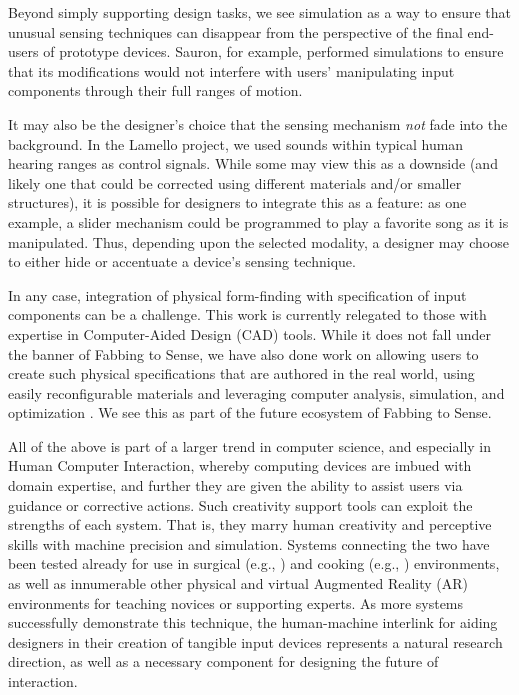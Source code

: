 Beyond simply supporting design tasks, we see simulation as a way to ensure that unusual sensing techniques can disappear from the perspective of the final end-users of prototype devices. Sauron, for example, performed simulations to ensure that its modifications would not interfere with users' manipulating input components through their full ranges of motion.

It may also be the designer's choice that the sensing mechanism \emph{not} fade into the background. In the Lamello project, we used sounds within typical human hearing ranges as control signals. While some may view this as a downside (and likely one that could be corrected using different materials and/or smaller structures), it is possible for designers to integrate this as a feature: as one example, a slider mechanism could be programmed to play a favorite song as it is manipulated. Thus, depending upon the selected modality, a designer may choose to either hide or accentuate a device's sensing technique.

In any case, integration of physical form-finding with specification of input components can be a challenge. This work is currently relegated to those with expertise in Computer-Aided Design (CAD) tools. While it does not fall under the banner of Fabbing to Sense, we have also done work on allowing users to create such physical specifications that are authored in the real world, using easily reconfigurable materials and leveraging computer analysis, simulation, and optimization \cite{savage-mmarks}. We see this as part of the future ecosystem of Fabbing to Sense.

All of the above is part of a larger trend in computer science, and especially in Human Computer Interaction, whereby computing devices are imbued with domain expertise, and further they are given the ability to assist users via guidance or corrective actions. Such creativity support tools can exploit the strengths of each system. That is, they marry human creativity and perceptive skills with machine precision and simulation. Systems connecting the two have been tested already for use in surgical (e.g., \cite{kahol-surgical}) and cooking (e.g., \cite{sato-mimicook}) environments, as well as innumerable other physical and virtual Augmented Reality (AR) environments for teaching novices or supporting experts. As more systems successfully demonstrate this technique, the human-machine interlink for aiding designers in their creation of tangible input devices represents a natural research direction, as well as a necessary component for designing the future of interaction.

